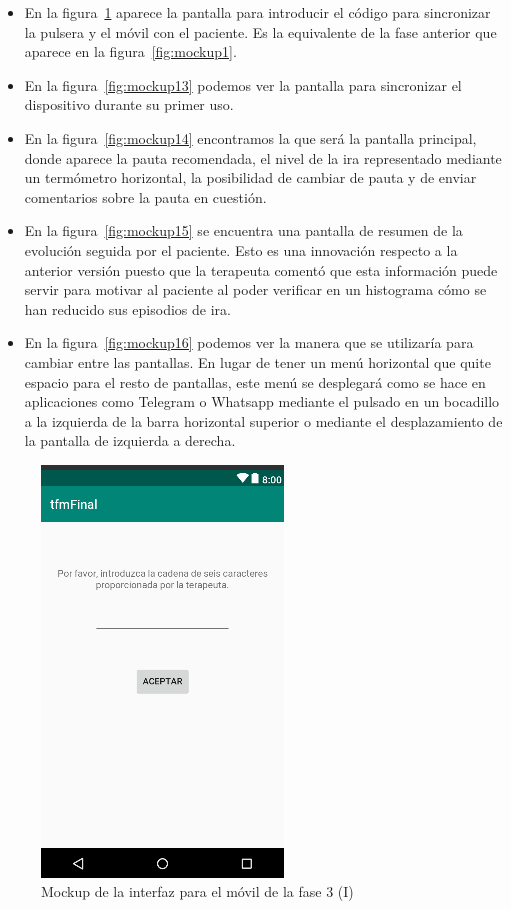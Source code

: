 \begin{itemize}
    \item En la figura~\ref{fig:mockup12} aparece la pantalla para introducir el código para sincronizar la pulsera y el móvil con el paciente. Es la equivalente de la fase anterior que aparece en la figura~\ref{fig:mockup1}.
    \item En la figura~\ref{fig:mockup13} podemos ver la pantalla para sincronizar el dispositivo durante su primer uso.
    \item En la figura~\ref{fig:mockup14} encontramos la que será la pantalla principal, donde aparece la pauta recomendada, el nivel de la ira representado mediante un termómetro horizontal, la posibilidad de cambiar de pauta y de enviar comentarios sobre la pauta en cuestión.
    \item En la figura~\ref{fig:mockup15} se encuentra una pantalla de resumen de la evolución seguida por el paciente. Esto es una innovación respecto a la anterior versión puesto que la terapeuta comentó que esta información puede servir para motivar al paciente al poder verificar en un histograma cómo se han reducido sus episodios de ira.
    \item En la figura~\ref{fig:mockup16} podemos ver la manera que se utilizaría para cambiar entre las pantallas. En lugar de tener un menú horizontal que quite espacio para el resto de pantallas, este menú se desplegará como se hace en aplicaciones como Telegram o Whatsapp mediante el pulsado en un bocadillo a la izquierda de la barra horizontal superior o mediante el desplazamiento de la pantalla de izquierda a derecha.
\end{itemize}

\begin{figure}[!htbp]
    \centering
    \includegraphics[scale=0.6]{Imagenes/anxA12.png}
    \caption[Mockup de la interfaz para el móvil de la fase 3 (I)]{Mockup de la interfaz para el móvil de la fase 3 (I)}
    \label{fig:mockup12}
\end{figure}

